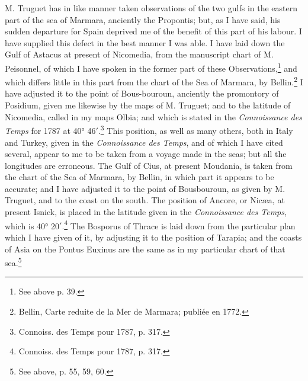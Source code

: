 \documentclass[a4paper, 11pt, oneside, polutonikogreek, english]{article}
\begin{document}
M. Truguet has in like manner taken observations of the two gulfs in the eastern part of the sea of Marmara, anciently the Propontis; but, as I have said, his sudden departure for Spain deprived me of the benefit of this part of his labour. I have supplied this defect in the best manner I was able. I have laid down the Gulf of Astacus at present of Nicomedia, from the manuscript chart of M. Peisonnel, of which I have spoken in the former part of these Observations,\footnote{See above p. 39.} and which differs little in this part from the chart of the Sea of Marmara, by Bellin.\footnote{Bellin, Carte reduite de la Mer de Marmara; publiée en 1772.} I have adjusted it to the point of Bous-bouroun, anciently the promontory of Posidium, given me likewise by the maps of M. Truguet; and to the latitude of Nicomedia, called in my maps Olbia; and which is stated in the \emph{Connoissance des Temps} for 1787 at 40° 46$'$.\footnote{Connoiss. des Temps pour 1787, p. 317.} This position, as well as many others, both in Italy and Turkey, given in the \emph{Connoissance des Temps}, and of which I have cited several, appear to me to be taken from a voyage made in the seas; but all the longitudes are erroneous. The Gulf of Cius, at present Moudania, is taken from the chart of the Sea of Marmara, by Bellin, in which part it appears to be accurate; and I have adjusted it to the point of Bousbouroun, as given by M. Truguet, and to the coast on the south. The position of Ancore, or Nicæa, at present Isnick, is placed in the latitude given in the \emph{Connoissance des Temps}, which is 40° 20$'$.\footnote{Connoiss. des Temps pour 1787, p. 317.} The Bosporus of Thrace is laid down from the particular plan which I have given of it, by adjusting it to the position of Tarapia; and the coasts of Asia on the Pontus Euxinus are the same as in my particular chart of that sea.\footnote{See above, p. 55, 59, 60.}
\end{document}
